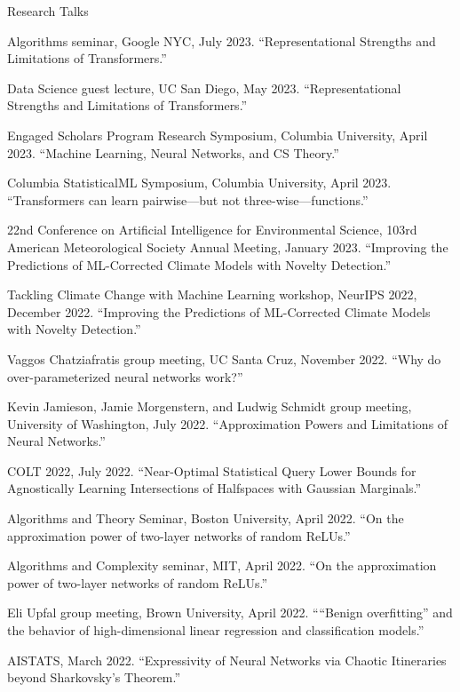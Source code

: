 \documentclass{cv} %
\begin{document}
\begin{rSection}{Research Talks}
\begin{rSubsection}{}{}{}

\item Algorithms seminar, Google NYC, July 2023. ``Representational Strengths and Limitations of Transformers.''
\item Data Science guest lecture, UC San Diego, May 2023. ``Representational Strengths and Limitations of Transformers.''
\item Engaged Scholars Program Research Symposium, Columbia University, April 2023. ``Machine Learning, Neural Networks, and CS Theory.''
\item Columbia StatisticalML Symposium, Columbia University, April 2023. ``Transformers can learn pairwise---but not three-wise---functions.''
\item 22nd Conference on Artificial Intelligence for Environmental Science, 103rd American Meteorological Society Annual Meeting, January 2023. ``Improving the Predictions of ML-Corrected Climate Models with Novelty Detection.''
\item Tackling Climate Change with Machine Learning workshop, NeurIPS 2022, December 2022. ``Improving the Predictions of ML-Corrected Climate Models with Novelty Detection.''
\item Vaggos Chatziafratis group meeting, UC Santa Cruz, November 2022. ``Why do over-parameterized neural networks work?''
\item Kevin Jamieson, Jamie Morgenstern, and Ludwig Schmidt group meeting, University of Washington, July 2022. ``Approximation Powers and Limitations of Neural Networks.''
\item COLT 2022, July 2022.  ``Near-Optimal Statistical Query Lower Bounds for Agnostically Learning Intersections of Halfspaces with Gaussian Marginals.''
\item Algorithms and Theory Seminar, Boston University, April 2022. ``On the approximation power of two-layer networks of random ReLUs.'' 
\item Algorithms and Complexity seminar, MIT, April 2022. ``On the approximation power of two-layer networks of random ReLUs.'' 
\item Eli Upfal group meeting, Brown University, April 2022. ``“Benign overfitting” and the behavior of high-dimensional linear regression and classification models.''
\item AISTATS, March 2022. ``Expressivity of Neural Networks via Chaotic Itineraries beyond Sharkovsky's Theorem.'' 

\end{rSubsection}
\end{rSection}
\end{document}
